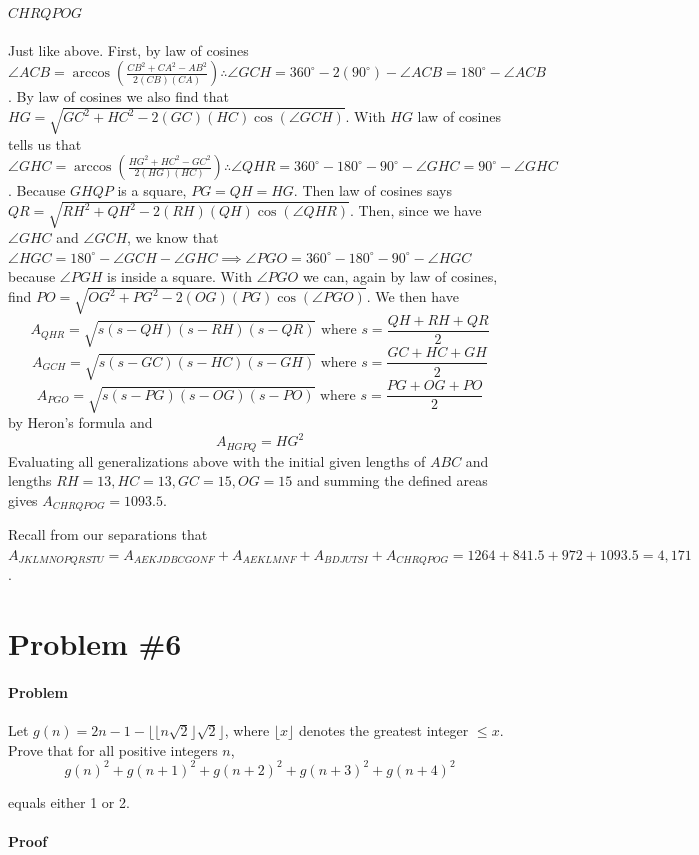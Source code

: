 \documentclass[10pt]{article}
\theoremstyle{plain}
\theoremstyle{definition}
\theoremstyle{remark}
\begin{document}
\paragraph{\(CHRQPOG\)} Just like above. First, by law of cosines \(\angle ACB=\arccos\left(\frac{CB^2+CA^2-AB^2}{2(CB)(CA)}\right)\therefore \angle GCH=360^{\circ}-2(90^{\circ})-\angle ACB=180^{\circ}-\angle ACB\). By law of cosines we also find that \(HG=\sqrt{GC^2+HC^2-2(GC)(HC)\cos(\angle GCH)}\). With \(HG\) law of cosines tells us that \(\angle GHC=\arccos\left(\frac{HG^2+HC^2-GC^2}{2(HG)(HC)}\right)\therefore \angle QHR=360^{\circ}-180^{\circ}-90^{\circ}-\angle GHC=90^{\circ}-\angle GHC\). Because \(GHQP\) is a square, \(PG=QH=HG\). Then law of cosines says \(QR=\sqrt{RH^2+QH^2-2(RH)(QH)\cos(\angle QHR)}\). Then, since we have \(\angle GHC\) and \(\angle GCH\), we know that \(\angle HGC=180^{\circ}-\angle GCH -\angle GHC\implies \angle PGO=360^{\circ}-180^{\circ}-90^{\circ}-\angle HGC\) because \(\angle PGH\) is inside a square. With \(\angle PGO\) we can, again by law of cosines, find \(PO=\sqrt{OG^2+PG^2-2(OG)(PG)\cos(\angle PGO)}\). We then have 
\[A_{QHR}=\sqrt{s(s-QH)(s-RH)(s-QR)} \text{ where }s=\frac{QH+RH+QR}{2}\]
\[A_{GCH}=\sqrt{s(s-GC)(s-HC)(s-GH)} \text{ where }s=\frac{GC+HC+GH}{2}\]
\[A_{PGO}=\sqrt{s(s-PG)(s-OG)(s-PO)} \text{ where }s=\frac{PG+OG+PO}{2}\]
by Heron's formula and 
\[A_{HGPQ}=HG^2\]
Evaluating all generalizations above with the initial given lengths of \(ABC\) and lengths \(RH=13,HC=13, GC=15, OG=15\) and summing the defined areas gives \(A_{CHRQPOG}=1093.5\).

Recall from our separations that \(A_{JKLMNOPQRSTU}=A_{AEKJDBCGONF}+A_{AEKLMNF}+A_{BDJUTSI}+A_{CHRQPOG}=1264+841.5+972+1093.5=\boxed{4,171}\).

\section{Problem \#6}

\paragraph{Problem} Let \(g(n)=2n-1-\lfloor\lfloor n\sqrt{2}\rfloor \sqrt{2}\rfloor\), where \(\lfloor x\rfloor\) denotes the greatest integer \(\leq x\). Prove that for all positive integers \(n\), \[g(n)^2+g(n+1)^2+g(n+2)^2+g(n+3)^2+g(n+4)^2\]

equals either 1 or 2.

\paragraph{Proof}
\end{document}

